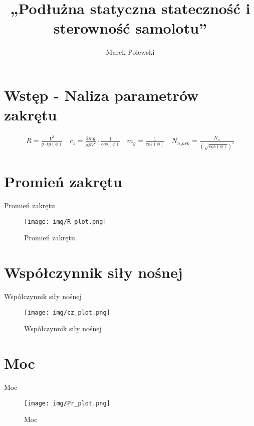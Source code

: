 \documentclass{sprawozdanie}
\title{„Podłużna statyczna stateczność i sterowność samolotu”}
\author{Marek Polewski}
\begin{document}
\maketitle

\leavevmode\thispagestyle{empty}


\tableofcontents

\FloatBarrier
\setcounter{page}{1}

\section{Wstęp - Naliza parametrów zakrętu}

\begin{align*}
    R = \frac{V^2}{g\cdot tg(\phi)} \quad c_z = \frac{2mg}{\rho S V^2} \cdot \frac{1}{cos (\phi)} \quad m_g = \frac{1}{cos(\phi)} \quad N_{n_zark} = \frac{N_n}{(\sqrt{cos(\phi)})^3}
\end{align*}

\section{Promień zakrętu}

\begin{table}[H]
    \centering
    
    \caption{Promień zakrętu}
    \label{tab:R}
\end{table}

\begin{figure}[H]
    \centering
    \texttt{[image: img/R\_plot.png]}
    \caption{Promień zakrętu}
    \label{fig:R}
\end{figure}

\section{Współczynnik siły nośnej }

\begin{table}[H]
    \centering
    
    \caption{Współczynnik siły nośnej}
    \label{tab:c_z}
\end{table}

\begin{figure}[H]
    \centering
    \texttt{[image: img/cz\_plot.png]}
    \caption{Współczynnik siły nośnej}
    \label{fig:c_z}
\end{figure}

\section{Moc}

\begin{table}[H]
    \centering
    
    \caption{Moc}
    \label{tab:P}
\end{table}

\begin{figure}[H]
    \centering
    \texttt{[image: img/Pr\_plot.png]}
    \caption{Moc}
    \label{fig:P}
\end{figure}



\printbibliography
\end{document}
